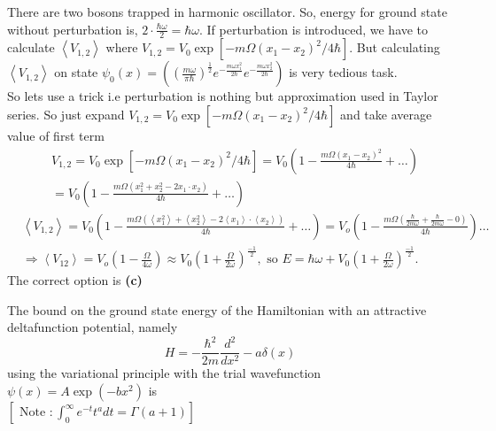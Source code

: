 \begin{enumerate}
\begin{answer}
	There are two bosons trapped in harmonic oscillator.
	So, energy for ground state without perturbation is, $2 \cdot \frac{\hbar \omega}{2}=\hbar \omega$.
	If perturbation is introduced, we have to calculate $\left\langle V_{1,2}\right\rangle$
	where $V_{1,2}=V_{0} \exp \left[-m \Omega\left(x_{1}-x_{2}\right)^{2} / 4 \hbar\right]$.
	But calculating $\left\langle V_{1,2}\right\rangle$ on state $\psi_{0}(x)=\left(\left(\frac{m \omega}{\pi \hbar}\right)^{\frac{1}{2}} e^{-\frac{m \omega x_{1}^{2}}{2 \hbar}} e^{-\frac{m \omega x_{2}^{2}}{2 \hbar}}\right)$ is very tedious task.\\
	So lets use a trick i.e perturbation is nothing but approximation used in Taylor series. So just expand $V_{1,2}=V_{0} \exp \left[-m \Omega\left(x_{1}-x_{2}\right)^{2} / 4 \hbar\right]$ and take average value of first term
	$$
	\begin{aligned}
	&V_{1,2}=V_{0} \exp \left[-m \Omega\left(x_{1}-x_{2}\right)^{2} / 4 \hbar\right]=V_{0}\left(1-\frac{m \Omega\left(x_{1}-x_{2}\right)^{2}}{4 \hbar}+\ldots\right) \\
	&=V_{0}\left(1-\frac{m \Omega\left(x_{1}^{2}+x_{2}^{2}-2 x_{1} \cdot x_{2}\right)}{4 \hbar}+\ldots\right)
	\end{aligned}
	$$
	$$\begin{aligned}
	&\left\langle V_{1,2}\right\rangle=V_{0}\left(1-\frac{m \Omega\left(\left\langle x_{1}^{2}\right\rangle+\left\langle x_{2}^{2}\right\rangle-2\left\langle x_{1}\right\rangle \cdot\left\langle x_{2}\right\rangle\right)}{4 \hbar}+\ldots\right)=V_{o}\left(1-\frac{m \Omega\left(\frac{\hbar}{2 m \omega}+\frac{\hbar}{2 m \omega}-0\right)}{4 \hbar}\right) \ldots \\
	&\Rightarrow\left\langle V_{12}\right\rangle=V_{o}\left(1-\frac{\Omega}{4 \omega}\right) \approx V_{0}\left(1+\frac{\Omega}{2 \omega}\right)^{\frac{-1}{2}}, \text { so } E=\hbar \omega+V_{0}\left(1+\frac{\Omega}{2 \omega}\right)^{\frac{-1}{2}} .
	\end{aligned}$$
	The correct option is \textbf{(c)}	
\end{answer}
\begin{minipage}{\textwidth}
	\item The bound on the ground state energy of the Hamiltonian with an attractive deltafunction potential, namely
	$$
	H=-\frac{\hbar^{2}}{2 m} \frac{d^{2}}{d x^{2}}-a \delta(x)
	$$
	using the variational principle with the trial wavefunction $\psi(x)=A \exp \left(-b x^{2}\right)$ is\\
	$\left[\text { Note }: \int_{0}^{\infty} e^{-t} t^{a} d t=\Gamma(a+1)\right]$

\end{minipage}
\end{enumerate}
